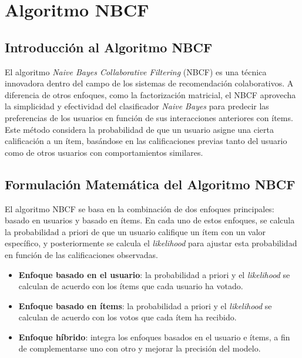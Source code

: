 \documentclass[runningheads,a4paper]{llncs}
\begin{document}
\section{Algoritmo NBCF}

\subsection{Introducción al Algoritmo NBCF}

El algoritmo \textit{Naive Bayes Collaborative 
Filtering} (NBCF) es una técnica innovadora dentro 
del campo de los sistemas de recomendación 
colaborativos. A diferencia de otros enfoques, 
como la factorización matricial, el NBCF aprovecha la 
simplicidad y efectividad del clasificador \textit{Naive Bayes} 
para predecir las preferencias de los usuarios en 
función de sus interacciones anteriores con ítems. 
Este método considera la probabilidad de que un 
usuario asigne una cierta calificación a un ítem, 
basándose en las calificaciones previas tanto del 
usuario como de otros usuarios con comportamientos 
similares.

\subsection{Formulación Matemática del Algoritmo NBCF}

El algoritmo NBCF se basa en la combinación de dos 
enfoques principales: basado en usuarios y basado 
en ítems. En cada uno de estos enfoques, se calcula la 
probabilidad a priori de que un usuario califique un 
ítem con un valor específico, y posteriormente se 
calcula el \textit{likelihood} para ajustar esta 
probabilidad en función de las calificaciones 
observadas.

\begin{itemize}
    \item \textbf{Enfoque basado en el usuario}:
    la probabilidad a priori y el \textit{likelihood} se
    calculan de acuerdo con los ítems que cada usuario ha votado. \cite{tesis_sistema_recomendador_hibrido}
    \item \textbf{Enfoque basado en ítems}:
    la probabilidad a priori y el \textit{likelihood} se calculan
    de acuerdo con los votos que cada ítem ha recibido. \cite{tesis_sistema_recomendador_hibrido}
    \item \textbf{Enfoque híbrido}:
    integra los enfoques basados en el usuario e ítems, a fin
    de complementarse uno con otro y mejorar la precisión del modelo. \cite{tesis_sistema_recomendador_hibrido}

\end{itemize}
\end{document}
